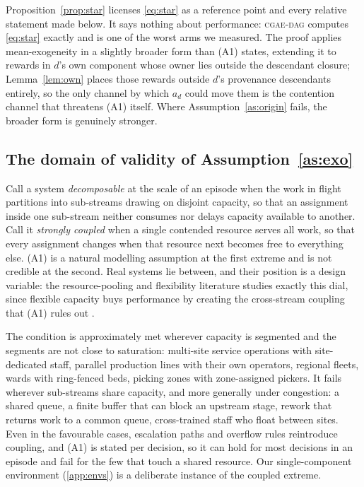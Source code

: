 \documentclass[review,authoryear,3p,times]{elsarticle}
\newcommand{\cdag}{\textsc{cgae-dag}}          %
\begin{document}
Proposition~\ref{prop:star} licenses \eqref{eq:star} as a reference point and
every relative statement made below. It says nothing about performance:
\cdag{} computes \eqref{eq:star} exactly and is one of the worst arms we
measured. The proof applies mean-exogeneity in a slightly broader form than
(A1) states, extending it to rewards in $d$'s own component whose owner lies
outside the descendant closure; Lemma~\ref{lem:own} places those rewards
outside $d$'s provenance descendants entirely, so the only channel by which
$a_d$ could move them is the contention channel that threatens (A1) itself.
Where Assumption~\ref{as:origin} fails, the broader form is genuinely stronger.

\subsection{The domain of validity of Assumption~\ref{as:exo}}
\label{sec:a1scope}

Call a system \emph{decomposable} at the scale of an episode when the work in
flight partitions into sub-streams drawing on disjoint capacity, so that an
assignment inside one sub-stream neither consumes nor delays capacity available
to another. Call it \emph{strongly coupled} when a single contended resource
serves all work, so that every assignment changes when that resource next
becomes free to everything else. (A1) is a natural modelling assumption at the
first extreme and is not credible at the second. Real systems lie between, and
their position is a design variable: the resource-pooling and flexibility
literature studies exactly this dial, since flexible capacity buys performance
by creating the cross-stream coupling that (A1) rules out
\citep{pooling_flexibility}.

The condition is approximately met wherever capacity is segmented and the
segments are not close to saturation: multi-site service operations with
site-dedicated staff, parallel production lines with their own operators,
regional fleets, wards with ring-fenced beds, picking zones with zone-assigned
pickers. It fails wherever sub-streams share capacity, and more generally under
congestion: a shared queue, a finite buffer that can block an upstream stage,
rework that returns work to a common queue, cross-trained staff who float
between sites. Even in the favourable cases, escalation paths and overflow
rules reintroduce coupling, and (A1) is stated per decision, so it can hold for
most decisions in an episode and fail for the few that touch a shared resource.
Our single-component environment (\ref{app:envs}) is a deliberate instance of
the coupled extreme.
\end{document}
